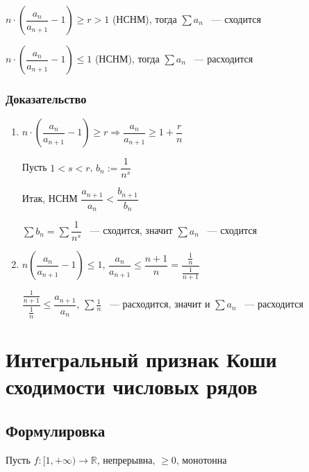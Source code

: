 \documentclass{article}
\begin{document}
                $n \cdot \left( \dfrac{a_n}{a_{n + 1}} - 1 \right) \geq r > 1$ (НСНМ), тогда $\sum a_n$ ~--- сходится
                
                $n \cdot \left( \dfrac{a_n}{a_{n + 1}} - 1 \right) \leq 1$ (НСНМ), тогда $\sum a_n$ ~--- расходится
                
            \subsubsection{Доказательство}
            
                \begin{enumerate}
                
                    \item $n \cdot \left( \dfrac{a_n}{a_{n + 1}} - 1 \right) \geq r \Rightarrow \dfrac{a_n}{a_{n + 1}} \geq 1 + \dfrac{r}{n}$
                    
                    Пусть $1 < s < r$, $b_n := \dfrac{1}{n^s}$
                    
                    Итак, НСНМ $\dfrac{a_{n + 1}}{a_n} < \dfrac{b_{n + 1}}{b_n}$
                    
                    $\sum b_n = \sum \dfrac{1}{n^s}$ ~--- сходится, значит $\sum a_n$ ~--- сходится
                    
                    \item $n \left( \dfrac{a_n}{a_{n + 1}} - 1 \right) \leq 1$, $\dfrac{a_n}{a_{n + 1}} \leq \dfrac{n + 1}{n} = \dfrac{\frac{1}{n}}{\frac{1}{n + 1}}$
                    
                    $\dfrac{\frac{1}{n + 1}}{\frac{1}{n}} \leq \dfrac{a_{n + 1}}{a_n}$, $\sum \frac{1}{n}$ ~--- расходится, значит и $\sum a_n$ ~--- расходится
                    
                \end{enumerate}
                
    
    \newpage
    
    \section{Интегральный признак Коши сходимости числовых рядов}
    
        \subsection{Формулировка}
        
            Пусть $f : [1, +\infty) \rightarrow \mathbb{R}$, непрерывна, $\geq 0$, монотонна
            
\end{document}
